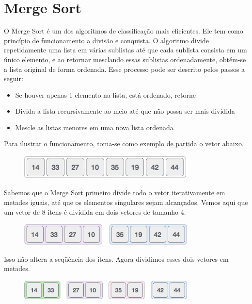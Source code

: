 \section{Merge Sort}

O Merge Sort é um dos algoritmos de classificação mais eficientes. Ele tem como princípio de funcionamento a divisão e conquista. O algoritmo divide repetidamente uma lista em várias sublistas até que cada sublista consista em um único elemento, e ao retornar mesclando essas sublistas ordenadamente, obtém-se a lista original de forma ordenada. Esse processo pode ser descrito pelos passos a seguir:

\begin{itemize}

	\item Se houver apenas 1 elemento na lista, está ordenado, retorne
	\item Divida a lista recursivamente ao meio até que não possa ser mais dividida
	\item Mescle as listas menores em uma nova lista ordenada

\end{itemize}

Para ilustrar o funcionamento, toma-se como exemplo de partida o vetor abaixo.

\begin{figure}[!htb]
\centering
\includegraphics[width=9cm]{img/merge1.jpg}
\label{fig:merge1}
\end{figure}

Sabemos que o Merge Sort primeiro divide todo o vetor iterativamente em metades iguais, até que os elementos singulares sejam alcançados. Vemos aqui que um vetor de 8 itens é dividida em dois vetores de tamanho 4. 

\begin{figure}[!htb]
\centering
\includegraphics[width=9cm]{img/merge2.jpg}
\label{fig:merge2}
\end{figure}

Isso não altera a seqüência dos itens. Agora dividimos esses dois vetores em metades. 

\begin{figure}[!htb]
\centering
\includegraphics[width=9cm]{img/merge3.jpg}
\label{fig:merge3}
\end{figure}

